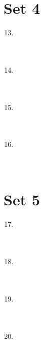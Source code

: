 \documentclass[11pt]{article}
\theoremstyle{definition}
\begin{document}
\eject

\section*{Set 4}

\begin{multicols*}{1} \begin{enumerate} 
\setcounter{enumi}{12}

\item \underline{\phantom{000000000000000}} \\ \\ \\
\item \underline{\phantom{000000000000000}} \\ \\ \\
\item \underline{\phantom{000000000000000}} \\ \\ \\
\item \underline{\phantom{000000000000000}} \\ \\ \\

\end{enumerate} \end{multicols*}

\eject

\section*{Set 5}

\begin{multicols*}{1} \begin{enumerate} 
\setcounter{enumi}{16}

\item \underline{\phantom{000000000000000}} \\ \\ \\
\item \underline{\phantom{000000000000000}} \\ \\ \\
\item \underline{\phantom{000000000000000}} \\ \\ \\
\item \underline{\phantom{000000000000000}} \\ \\ \\

\end{enumerate} \end{multicols*}
\end{document}
